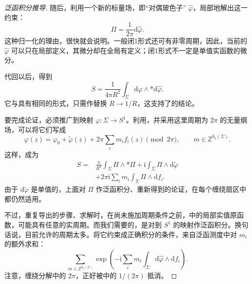 \begin{proof}[泛函积分推导]
随后，利用一个新的标量场，即“对偶玻色子” $\widehat\varphi$，局部地解出这一约束：
\begin{equation}\label{eq:3.63}
\Pi=\frac1{2\pi}\mathrm{d}\widehat\varphi.
\end{equation}
这种归一化的理由，很快就会说明。一般闭1形式还可有非零周期，因此，当前的 $\widehat\varphi$ 可以只在局部定义，其微分却在全局有定义；闭1形式不一定是单值实函数的微分。

代回以后，得到
\begin{equation}\label{eq:3.64}
S=\frac1{4\pi R^2}\int_\Sigma
\mathrm{d}\widehat\varphi\wedge*\mathrm{d}\widehat\varphi.
\end{equation}
它与具有相同的形式，只需作替换 $R\to1/R$，这支持了的结论。

要完成论证，必须推广到映射 $\varphi\colon\Sigma\to S^1$。利用，并采用这里周期为 $2\pi$ 的无量纲场，可以将它们写成
\[
\varphi(z)=\varphi_0+\widetilde\varphi(z)
+2\pi\sum_i m_i f_i(z)\pmod{2\pi},
\qquad m\in\mathbb{Z}^{b_1(\Sigma)}.
\]
这样，成为
\begin{equation}\label{eq:3.65}
\begin{aligned}
S={}&\frac{\pi}{R^2}\int_\Sigma\Pi\wedge*\Pi
+\mathrm{i}\int_\Sigma\Pi\wedge\mathrm{d}\widetilde\varphi\\
&+2\pi\mathrm{i}\sum_i m_i
\int_\Sigma\Pi\wedge\mathrm{d}f_i.
\end{aligned}
\end{equation}
由于 $\mathrm{d}\widetilde\varphi$ 是单值的，上面对 $\Pi$ 作泛函积分、重新得到的论证，在每个缠绕扇区中都仍然适用。

不过，重复导出的步骤、求解时，在尚未施加周期条件之前，中的局部实值原函数，可能具有任意的实周期。而我们需要的，是对到 $S^1$ 的映射作泛函积分。换句话说，目前允许的周期太多。将它约束成正确积分的条件，来自泛函测度中对 $m_i$ 的额外求和：
\begin{equation}\label{eq:3.66}
\sum_{m\in\mathbb{Z}^{b_1(\Sigma)}}
\exp\left(-\mathrm{i}\sum_i m_i
\int_\Sigma\mathrm{d}\widehat\varphi\wedge\mathrm{d}f_i\right).
\end{equation}
注意，缠绕分解中的 $2\pi$，正好被中的 $1/(2\pi)$ 抵消。


\end{proof}
